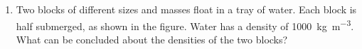 \documentclass{../../../oss-apphys}
\begin{document}
\genheader


\genmultidirections

\gengravity

\raggedcolumns
\begin{multicols}{2}

  \begin{enumerate}[leftmargin=18pt]

  \item Two blocks of different sizes and masses float in a tray of water. Each
    block is half submerged, as shown in the figure. Water has a density of
    \SI{1000}{\kilo\gram\per\metre^3}. What can be concluded about the
    densities of the two blocks?
%    
%
%    

\end{enumerate}
\end{multicols}
\end{document}
